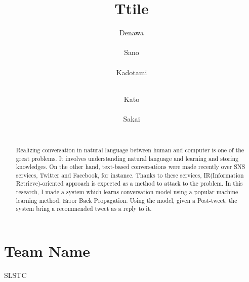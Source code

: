 \documentclass{../style/sig-alternate}
\begin{document}
\title{Ttile}

\author{
%
%
\alignauthor
Denawa\\
       \\
\alignauthor
Sano\\
       \\
\alignauthor
Kadotami\\
       \\
\and  %
\alignauthor
Kato\\
       \\
\alignauthor
Sakai\\
       \\
}

\maketitle

\begin{abstract}
Realizing conversation in natural language between human and computer is one of the great problems. It involves understanding natural language and learning and storing knowledges. On the other hand, text-based conversations were made recently over SNS services, Twitter and Facebook, for instance.
Thanks to these services, IR(Information Retrieve)-oriented approach is expected as a method to attack to the problem.
 In this research, I made a system which learns conversation model using a popular machine learning method, Error Back Propagation. Using the model, given a Post-tweet, the system bring a recommended tweet as a reply to it.
\end{abstract}

\section*{Team Name}
SLSTC
\end{document}

